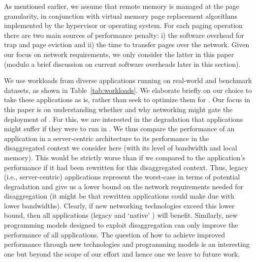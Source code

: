 As mentioned earlier, we assume that remote memory is managed at the page granularity, in conjunction with virtual memory page replacement algorithms implemented by the hypervisor or operating system.
For each paging operation there are two main sources 
of performance penalty: i) the software overhead for trap and page eviction and ii) the time to transfer pages over the network. 
Given our focus on network requirements, we only consider the latter in this paper (modulo a brief discussion on current 
software overheads later in this section).

We use workloads from diverse applications running on real-world and benchmark datasets, as shown in Table~\ref{tab:workloads}. 
We elaborate briefly on our choice to take these applications as is, rather than seek to optimize them for \dis. Our focus in this paper is on understanding whether and why networking might gate the deployment of \dis.  For this, we are interested in the degradation that applications might suffer if they were to run in \dis. We thus compare the performance of an application in a server-centric architecture to its performance in the disaggregated context we consider here (with its level of bandwidth and local memory). This would be strictly worse than if we compared to the application's performance if it had been rewritten for this disaggregated context. Thus, legacy (i.e., server-centric) applications represent the worst-case in terms of potential degradation and give us a lower bound on the network requirements needed for disaggregation (it might be that rewritten applications could make due with lower bandwidths). Clearly, if new networking technologies exceed this lower bound, then all applications (legacy and `native' \dis) will benefit. Similarly, new programming models designed to exploit disaggregation can only improve the performance of all applications. The question of how to achieve improved performance through new technologies and programming models is an interesting one but beyond the scope of our effort and hence one we leave to future work. 


